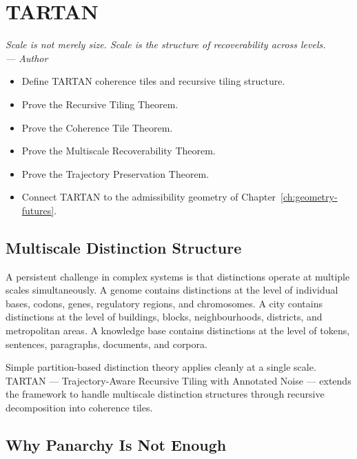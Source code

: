 \documentclass[12pt,twoside,openright]{book}
\newenvironment{epigraph}[2]{%
  \vspace{1em}\begin{flushright}
  \begin{minipage}{0.72\textwidth}
  \itshape\small #1\\[0.4em]
  \upshape\footnotesize\sffamily\color{DistGray}--- #2
  \end{minipage}\end{flushright}\vspace{1.5em}}{}
\newenvironment{objectives}{%
  \begin{tcolorbox}[colback=DistBlue!5,colframe=DistBlue,
    title={\faCheckCircle\enspace Learning Objectives},
    fonttitle=\sffamily\bfseries\color{white},
    attach boxed title to top left={yshift=-2mm,xshift=4mm},
    boxed title style={colback=DistBlue},breakable]
  \begin{itemize}[leftmargin=*,nosep]}{%
  \end{itemize}\end{tcolorbox}\vspace{1em}}
\begin{document}
\chapter{TARTAN}
\label{ch:tartan}

\begin{epigraph}{%
  Scale is not merely size.
  Scale is the structure of recoverability across levels.}%
  {Author}
\end{epigraph}

\begin{objectives}
  \item Define TARTAN coherence tiles and recursive
        tiling structure.
  \item Prove the Recursive Tiling Theorem.
  \item Prove the Coherence Tile Theorem.
  \item Prove the Multiscale Recoverability Theorem.
  \item Prove the Trajectory Preservation Theorem.
  \item Connect TARTAN to the admissibility geometry
        of Chapter~\ref{ch:geometry-futures}.
\end{objectives}

\section{Multiscale Distinction Structure}

A persistent challenge in complex systems is that
distinctions operate at multiple scales simultaneously.
A genome contains distinctions at the level of
individual bases, codons, genes, regulatory regions,
and chromosomes. A city contains distinctions at the
level of buildings, blocks, neighbourhoods, districts,
and metropolitan areas. A knowledge base contains
distinctions at the level of tokens, sentences,
paragraphs, documents, and corpora.

Simple partition-based distinction theory applies
cleanly at a single scale. TARTAN — Trajectory-Aware
Recursive Tiling with Annotated Noise — extends the
framework to handle multiscale distinction structures
through recursive decomposition into coherence tiles.

\section{Why Panarchy Is Not Enough}
\label{sec:ch26-why-panarchy}
\end{document}
